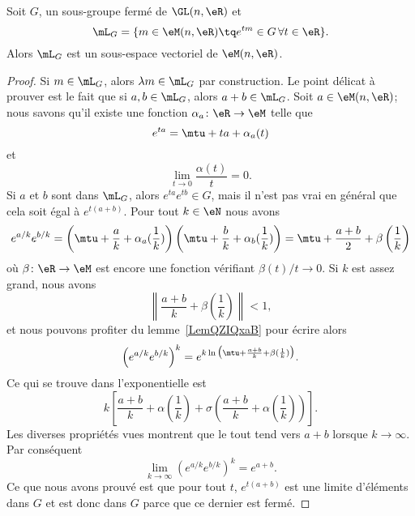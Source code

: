\begin{lemma}
    Soit \( G\), un sous-groupe fermé de \( \GL(n,\eR)\) et
    \begin{equation}
        \mL_G=\{ m\in \eM(n,\eR)\tq  e^{tm}\in G\,\forall t\in\eR \}.
    \end{equation}
    Alors \( \mL_G\) est un sous-espace vectoriel de \( \eM(n,\eR)\).
\end{lemma}

\begin{proof}
    Si \( m\in\mL_G\), alors \( \lambda m\in\mL_G\) par construction. Le point délicat à prouver est le fait que si \( a,b\in \mL_G\), alors \( a+b\in\mL_G\). Soit \( a\in \eM(n,\eR)\); nous savons qu'il existe une fonction \( \alpha_a\colon \eR\to \eM\) telle que
    \begin{equation}
        e^{ta}=\mtu+ta+\alpha_a(t)
    \end{equation}
    et
    \begin{equation}
        \lim_{t\to 0} \frac{ \alpha(t) }{ t }=0.
    \end{equation}
    Si \( a\) et \( b\) sont dans \( \mL_G\), alors \(  e^{ta} e^{tb}\in G\), mais il n'est pas vrai en général que cela soit égal à \(  e^{t(a+b)}\). Pour tout \( k\in \eN\) nous avons
    \begin{equation}
        e^{a/k} e^{b/k}=\left( \mtu+\frac{ a }{ k }+\alpha_a(\frac{1}{ k }) \right)\left( \mtu+\frac{ b }{ k }+\alpha_b(\frac{1}{ k }) \right)=\mtu+\frac{ a+b }{2}+\beta\left( \frac{1}{ k } \right)
    \end{equation}
   où \( \beta\colon \eR\to \eM\) est encore une fonction vérifiant \( \beta(t)/t\to 0\). Si \( k\) est assez grand, nous avons
   \begin{equation}
       \left\| \frac{ a+b }{ k }+\beta(\frac{1}{ k })  \right\|<1,
   \end{equation}
   et nous pouvons profiter du lemme~\ref{LemQZIQxaB} pour écrire alors
   \begin{equation}
       \left(  e^{a/k} e^{b/k} \right)^k= e^{k\ln\big(\mtu+\frac{ a+b }{ k }+\beta(\frac{1}{ k })\big)}.
   \end{equation}
   Ce qui se trouve dans l'exponentielle est
   \begin{equation}
       k\left[ \frac{ a+b }{ k }+\alpha( \frac{1}{ k })+\sigma\left( \frac{ a+b }{ k }+\alpha(\frac{1}{ k }) \right) \right].
   \end{equation}
   Les diverses propriétés vues montrent que le tout tend vers \( a+b\) lorsque \( k\to \infty\). Par conséquent
   \begin{equation}
       \lim_{k\to \infty} \left(  e^{a/k} e^{b/k} \right)^k= e^{a+b}.
   \end{equation}
   Ce que nous avons prouvé est que pour tout \( t\), \(  e^{t(a+b)}\) est une limite d'éléments dans \( G\) et est donc dans \( G\) parce que ce dernier est fermé.
\end{proof}

